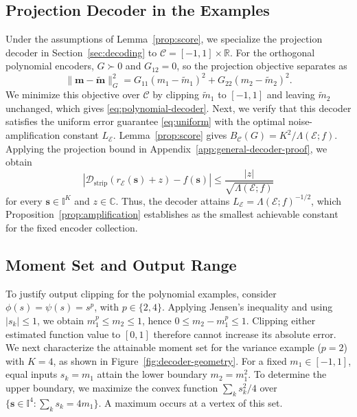 \documentclass[journal,12pt,onecolumn,draftclsnofoot]{IEEEtran}
\newcommand{\enc}{\mathscr{E}}\newcommand{\dec}{\mathscr{D}}\newcommand{\R}{\mathbb R}\newcommand{\C}{\mathbb C}
\begin{document}
\subsection{Projection Decoder in the Examples}\label{app:strip-decoder-proof}




Under the assumptions of Lemma~\ref{prop:score}, we specialize
the projection decoder in Section~\ref{sec:decoding} to
$\mathcal C=[-1,1]\times\R$. For the orthogonal polynomial
encoders, $G\succ0$ and $G_{12}=0$, so the projection objective
separates as
$$
\|\boldsymbol m-\tilde{\boldsymbol m}\|_G^2
=G_{11}(m_1-\tilde m_1)^2
+G_{22}(m_2-\tilde m_2)^2.
$$
We minimize this objective over $\mathcal C$ by clipping
$\tilde m_1$ to $[-1,1]$ and leaving $\tilde m_2$ unchanged,
which gives \eqref{eq:polynomial-decoder}. Next, we verify that this decoder satisfies the uniform error
guarantee \eqref{eq:uniform} with the optimal
noise-amplification constant $L_\enc$.
Lemma~\ref{prop:score} gives
$B_{\mathcal C}(G)=K^2/\Lambda(\enc;f)$.
Applying the projection bound in
Appendix~\ref{app:general-decoder-proof}, we obtain
$$
\left|
\dec_{\mathrm{strip}}(r_\enc(\boldsymbol s)+z)
-f(\boldsymbol s)
\right|
\le
\frac{|z|}{\sqrt{\Lambda(\enc;f)}}
$$
for every $\boldsymbol s\in\mathbb I^K$ and $z\in\C$.
Thus, the decoder attains
$L_\enc=\Lambda(\enc;f)^{-1/2}$, which
Proposition~\ref{prop:amplification} establishes as the
smallest achievable constant for the fixed encoder collection.





\subsection{Moment Set and Output Range}\label{app:moment-region-proof}


To justify output clipping for the polynomial examples, consider
$\phi(s)=\psi(s)=s^p$, with $p\in\{2,4\}$. Applying Jensen's
inequality and using $|s_k|\le1$, we obtain
$m_1^p\le m_2\le1$, hence $0\le m_2-m_1^p\le1$.
Clipping either estimated function value to $[0,1]$
therefore cannot increase its absolute error. We next characterize the attainable moment set for the variance
example ($p=2$) with $K=4$, as shown in
Figure~\ref{fig:decoder-geometry}. For a fixed $m_1\in[-1,1]$,
equal inputs $s_k=m_1$ attain the lower boundary $m_2=m_1^2$.
To determine the upper boundary, we maximize the convex function
$\sum_k s_k^2/4$ over
$\{\boldsymbol s\in\mathbb I^4:\sum_k s_k=4m_1\}$.
A maximum occurs at a vertex of this set.
\end{document}
